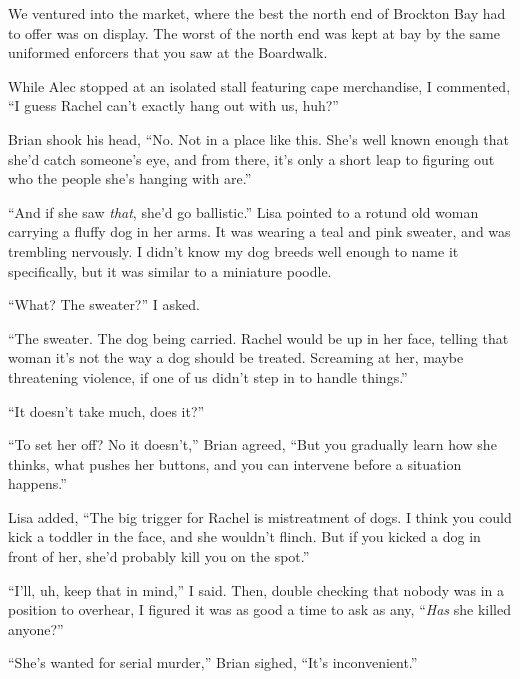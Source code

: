 We ventured into the market, where the best the north end of Brockton Bay had to offer was on display.  The worst of the north end was kept at bay by the same uniformed enforcers that you saw at the Boardwalk.



While Alec stopped at an isolated stall featuring cape merchandise, I commented, ``I guess Rachel can't exactly hang out with us, huh?''



Brian shook his head, ``No.  Not in a place like this.  She's well known enough that she'd catch someone's eye, and from there, it's only a short leap to figuring out who the people she's hanging with are.''



``And if she saw \emph{that}, she'd go ballistic.''  Lisa pointed to a rotund old woman carrying a fluffy dog in her arms.   It was wearing a teal and pink sweater, and was trembling nervously.  I didn't know my dog breeds well enough to name it specifically, but it was similar to a miniature poodle.



``What?  The sweater?'' I asked.



``The sweater.  The dog being carried.  Rachel would be up in her face, telling that woman it's not the way a dog should be treated.  Screaming at her, maybe threatening violence, if one of us didn't step in to handle things.''



``It doesn't take much, does it?''



``To set her off?  No it doesn't,'' Brian agreed, ``But you gradually learn how she thinks, what pushes her buttons, and you can intervene before a situation happens.''



Lisa added, ``The big trigger for Rachel is mistreatment of dogs.  I think you could kick a toddler in the face, and she wouldn't flinch.  But if you kicked a dog in front of her, she'd probably kill you on the spot.''



``I'll, uh, keep that in mind,'' I said.  Then, double checking that nobody was in a position to overhear, I figured it was as good a time to ask as any, ``\emph{Has} she killed anyone?''



``She's wanted for serial murder,'' Brian sighed, ``It's inconvenient.''



